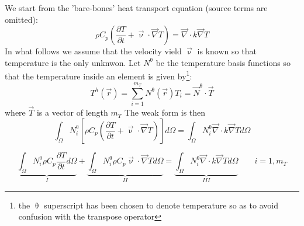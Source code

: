 We start from the 'bare-bones' heat transport equation (source terms are omitted): 
\begin{equation}
\rho C_p \left( \frac{\partial T}{\partial t} + {\vec \upnu}\cdot {\vec\nabla T} \right)
= {\vec \nabla} \cdot k \vec\nabla T 
\end{equation}
In what follows we assume that the velocity vield $\vec \upnu$ is known so that temperature is the 
only unknwon.
Let $N^\uptheta$ be the temperature basis functions so that the temperature inside an element is 
given by\footnote{the $\uptheta$ superscript has been chosen to denote temperature so as to avoid confusion
with the transpose operator}:
\begin{equation}
T^h({\vec r}) = \sum_{i=1}^{m_T} N^\uptheta ({\vec r}) T_i = \vec N^\uptheta \cdot \vec T
\end{equation}
where $\vec T$ is a vector of length $m_T$
The weak form is then 
\begin{equation}
\int_\Omega N^\uptheta_i \left[ 
\rho C_p \left( \frac{\partial T}{\partial t} + {\vec \upnu}\cdot {\vec\nabla T} \right) \right] d\Omega
= \int_\Omega  N^\uptheta_i {\vec \nabla} \cdot k \vec\nabla T  d\Omega
\end{equation}

\[
\underbrace{\int_\Omega N^\uptheta_i  \rho C_p \frac{\partial T}{\partial t} d\Omega}_{I}
+ \underbrace{\int_\Omega N^\uptheta_i  \rho C_p  {\vec \upnu}\cdot {\vec\nabla T}   d\Omega}_{II}
= \underbrace{\int_\Omega  N^\uptheta_i {\vec \nabla} \cdot k \vec\nabla T d\Omega}_{III}
\quad\quad
i=1,m_T
\]

